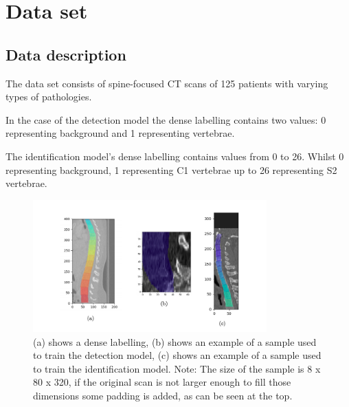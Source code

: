 \chapter{Data set}
\label{ch:data_set}

\section{Data description}
The data set consists of spine-focused CT scans of 125 patients with varying types of pathologies. 

In the case of the detection model the dense labelling contains two values: 0 representing background and 1 representing vertebrae. 

The identification model’s dense labelling contains values from 0 to 26. Whilst 0 representing background, 1 representing C1 vertebrae up to 26 representing S2 vertebrae.

\begin{figure}[h]
    \centering \includegraphics[width=9cm]{images/labeled_data.png}
    \caption {(a) shows a dense labelling, (b) shows an example of a sample used to train the detection model, (c) shows an example of a sample used to train the identification model. Note: The size of the sample is 8 x 80 x 320, if the original scan is not larger enough to fill those dimensions some padding is added, as can be seen at the top.}
    \label{fig:labeled_data}
\end{figure}


